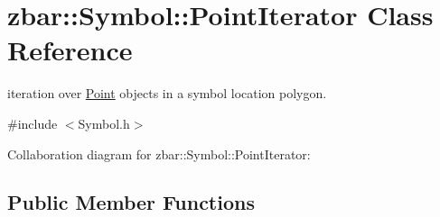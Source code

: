 \hypertarget{classzbar_1_1_symbol_1_1_point_iterator}{
\section{zbar::Symbol::PointIterator Class Reference}
\label{classzbar_1_1_symbol_1_1_point_iterator}
}


iteration over \hyperlink{classzbar_1_1_symbol_1_1_point}{Point} objects in a symbol location polygon.  




{\ttfamily \#include $<$Symbol.h$>$}



Collaboration diagram for zbar::Symbol::PointIterator:
\subsection*{Public Member Functions}
